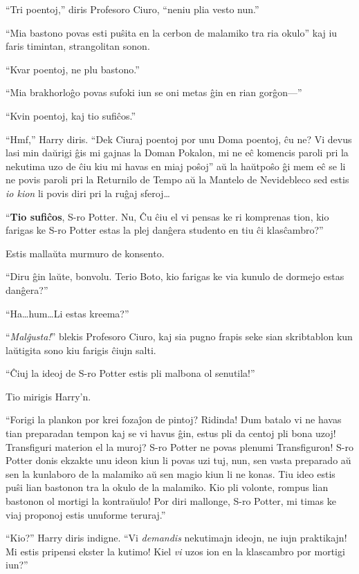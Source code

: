``Tri poentoj,'' diris Profesoro Ciuro, ``neniu plia vesto nun.''

``Mia bastono povas esti puŝita en la cerbon de malamiko tra ria
okulo'' kaj iu faris timintan, strangolitan sonon.

``Kvar poentoj, ne plu bastono.''

``Mia brakhorloĝo povas sufoki iun se oni metas ĝin en rian gorĝon—''

``Kvin poentoj, kaj tio sufiĉos.''

``Hmf,'' Harry diris. ``Dek Ciuraj poentoj por unu Doma poentoj, ĉu
ne?  Vi devus lasi min daŭrigi ĝis mi gajnas la Doman Pokalon, mi ne
eĉ komencis paroli pri la nekutima uzo de ĉiu kiu mi havas en miaj
poŝoj'' aŭ la haŭtpoŝo ĝi mem eĉ se li ne povis paroli pri la
Returnilo de Tempo aŭ la Mantelo de Nevidebleco sed estis \emph{io
kion} li povis diri pri la ruĝaj sferoj\ldots

``\textbf{Tio sufiĉos}, S-ro Potter. Nu, Ĉu ĉiu el vi pensas ke ri komprenas
tion, kio farigas ke S-ro Potter estas la plej danĝera studento en tiu
ĉi klasĉambro?''

Estis mallaŭta murmuro de konsento.

``Diru ĝin laŭte, bonvolu. Terio Boto, kio farigas ke via kunulo de dormejo estas danĝera?''

``Ha\ldots hum\ldots Li estas kreema?''

``\emph{Malĝusta!}'' blekis Profesoro Ciuro, kaj sia pugno frapis seke
sian skribtablon kun laŭtigita sono kiu farigis ĉiujn salti.

``Ĉiuj la ideoj de S-ro Potter estis pli malbona ol senutila!''

Tio mirigis Harry'n.

``Forigi la plankon por krei fozaĵon de pintoj? Ridinda! Dum batalo vi
ne havas tian preparadan tempon kaj se vi havus ĝin, estus pli da
centoj pli bona uzoj! Transfiguri materion el la muroj? S-ro Potter ne
povas plenumi Transfiguron! S-ro Potter donis ekzakte unu ideon kiun
li povas uzi tuj, nun, sen vasta preparado aŭ sen la kunlaboro de la
malamiko aŭ sen magio kiun li ne konas. Tiu ideo estis puŝi lian
bastonon tra la okulo de la malamiko. Kio pli volonte, rompus lian
bastonon ol mortigi la kontraŭulo! Por diri mallonge, S-ro Potter, mi
timas ke viaj proponoj estis unuforme teruraj.''

``Kio?'' Harry diris indigne. ``Vi \emph{demandis} nekutimajn ideojn,
ne iujn praktikajn! Mi estis pripensi ekster la kutimo! Kiel \emph{vi}
uzos ion en la klascambro por mortigi iun?''


